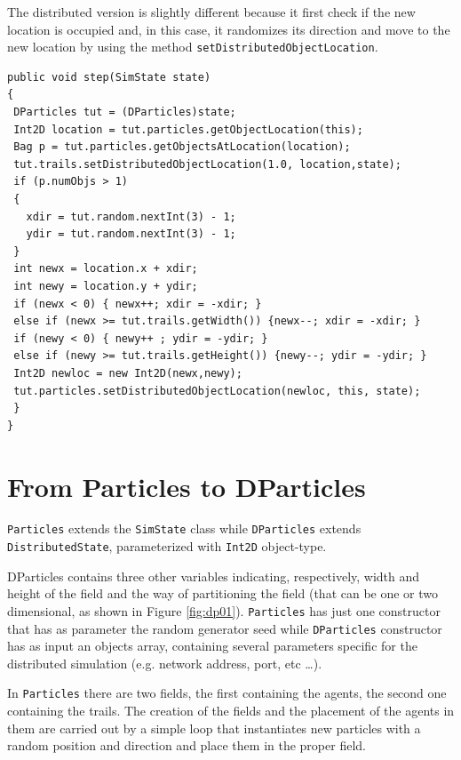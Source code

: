 \documentclass{book}
\begin{document}
The distributed version is slightly different because it first check if the new location is occupied and, in this case, it randomizes its direction and move to the new location by using the method \texttt{setDistributedObjectLocation}.


\begin{lstlisting}
public void step(SimState state)
{
 DParticles tut = (DParticles)state;
 Int2D location = tut.particles.getObjectLocation(this);
 Bag p = tut.particles.getObjectsAtLocation(location);
 tut.trails.setDistributedObjectLocation(1.0, location,state);
 if (p.numObjs > 1)
 {
   xdir = tut.random.nextInt(3) - 1; 
   ydir = tut.random.nextInt(3) - 1;
 }
 int newx = location.x + xdir;
 int newy = location.y + ydir;
 if (newx < 0) { newx++; xdir = -xdir; } 
 else if (newx >= tut.trails.getWidth()) {newx--; xdir = -xdir; }
 if (newy < 0) { newy++ ; ydir = -ydir; }
 else if (newy >= tut.trails.getHeight()) {newy--; ydir = -ydir; }
 Int2D newloc = new Int2D(newx,newy);
 tut.particles.setDistributedObjectLocation(newloc, this, state);
 }
}
\end{lstlisting}


\section{From Particles to DParticles}
\texttt{Particles} extends the \texttt{SimState} class  while \texttt{DParticles} extends \texttt{DistributedState}, parameterized with \texttt{Int2D} object-type.

DParticles contains three other variables indicating, respectively, width and height of the field and the way of partitioning the field (that can be one or two dimensional, as shown in Figure \ref{fig:dp01}). \texttt{Particles} has just one constructor that has as parameter the random generator seed while \texttt{DParticles} constructor has as input an objects array, containing several parameters specific for the distributed simulation (e.g. network address, port, etc \ldots). 

In \texttt{Particles} there are two fields, the first containing the agents, the second one containing the trails. The creation of the fields and the placement of the agents in them are carried out by a simple loop that instantiates new particles with a random position and direction and place them in the proper field. 
\end{document}

